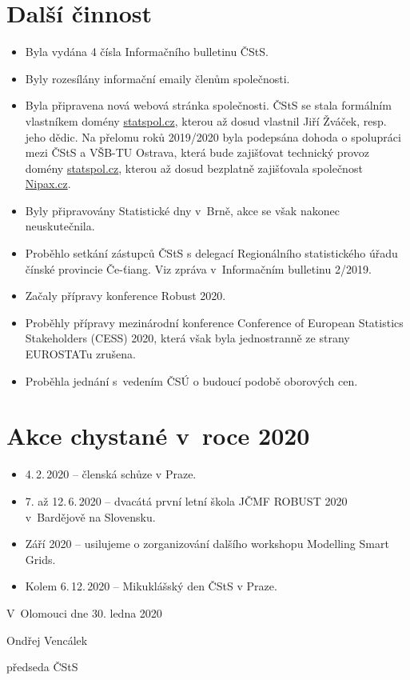 \section*{Další činnost}
\begin{itemize}
\itemsep=0pt
\item Byla vydána 4 čísla Informačního bulletinu ČStS.
\item Byly rozesílány informační emaily členům společnosti.
\item Byla připravena nová webová stránka společnosti. ČStS se stala formálním vlastníkem domény \url{statspol.cz}, kterou až dosud vlastnil Jiří Žváček, resp. jeho dědic. Na přelomu roků 2019/2020 byla podepsána dohoda o spolupráci mezi ČStS a VŠB-TU Ostrava, která bude zajišťovat technický provoz domény \url{statspol.cz}, kterou až dosud bezplatně zajišťovala společnost \url{Nipax.cz}.
\item Byly připravovány Statistické dny v Brně, akce se však nakonec neuskutečnila.
\item Proběhlo setkání zástupců ČStS s delegací Regionálního statistického úřadu čínské provincie Če-ťiang. Viz zpráva v Informačním bulletinu 2/2019.
\item Začaly přípravy konference Robust 2020.
\item Proběhly přípravy mezinárodní konference Conference of European Statistics Stakeholders (CESS) 2020, která však byla jednostranně ze strany EUROSTATu zrušena.
\item Proběhla jednání s vedením ČSÚ o budoucí podobě oborových cen.
\end{itemize}

\section*{Akce chystané v roce 2020}
\begin{itemize}
\itemsep=0pt
\item 4.\,2.\,2020 – členská schůze v Praze.
\item 7. až 12.\,6.\,2020 -- dvacátá první letní škola JČMF ROBUST 2020 v Bardějově na Slovensku.
\item Září 2020 -- usilujeme o zorganizování dalšího workshopu Modelling Smart Grids.
\item Kolem 6.\,12.\,2020 -- Mikuklášský den ČStS v Praze.
\end{itemize}
\bigskip

\noindent
V Olomouci dne 30. ledna 2020					

\hspace*{6cm} \hfil Ondřej Vencálek\par
\hspace*{6cm} \hfil předseda ČStS
